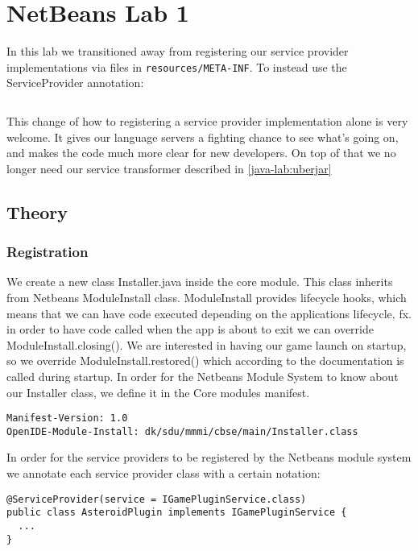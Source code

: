 \section{NetBeans Lab 1}

In this lab we transitioned away from registering our service provider
implementations via files in \texttt{resources/META-INF}. To instead use the
ServiceProvider annotation:

\inputminted{java}{code/openide-service-provider.java}

This change of how to registering a service provider implementation alone is
very welcome. It gives our language servers a fighting chance to see what's
going on, and makes the code much more clear for new developers. On top of that
we no longer need our service transformer described in \ref{java-lab:uberjar}


\subsection{Theory}
\subsubsection{Registration}
We create a new class Installer.java inside the core module. This class inherits
from Netbeans ModuleInstall class. ModuleInstall provides lifecycle hooks, which
means that we can have code executed depending on the applications lifecycle,
fx. in order to have code called when the app is about to exit we can override
ModuleInstall.closing(). We are interested in having our game launch on startup,
so we override ModuleInstall.restored() which according to the documentation
\cite{netbeans-module-install} is called during startup.
In order for the Netbeans Module System to know about our Installer class, we
define it in the Core modules manifest.

\begin{verbatim}
Manifest-Version: 1.0
OpenIDE-Module-Install: dk/sdu/mmmi/cbse/main/Installer.class
\end{verbatim}

In order for the service providers to be registered by the Netbeans module
system we annotate each service provider class with a certain notation:
\begin{verbatim}
@ServiceProvider(service = IGamePluginService.class)
public class AsteroidPlugin implements IGamePluginService {
  ...
}
\end{verbatim}

